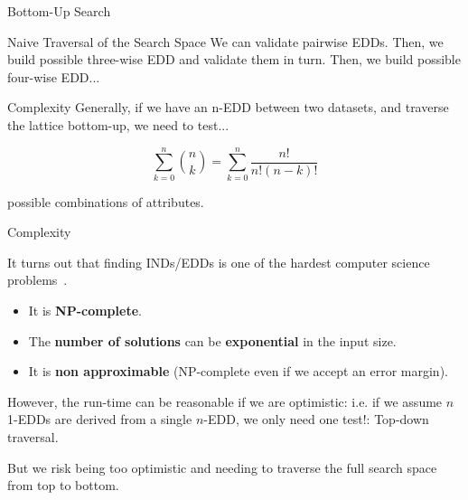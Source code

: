 \documentclass[10pt]{beamer}
\begin{document}
\begin{frame}{Bottom-Up Search}
    \begin{block}{Naive Traversal of the Search Space}
        \smallskip
        We can validate pairwise EDDs. Then, we build possible three-wise EDD and validate them in turn.
        Then, we build possible four-wise EDD...
    \end{block}
        
    \begin{alertblock}{Complexity}
    \smallskip
    Generally, if we have an n-EDD between two datasets, and traverse the lattice bottom-up, we need
    to test...
    
    \begin{equation*}
        \sum_{k=0}^{n}{\binom{n}{k}} = \sum_{k=0}^{n} \frac{n!}{n!(n - k)!}
    \end{equation*}
    
    possible combinations of attributes.
    \end{alertblock}
\end{frame}

\begin{frame}{Complexity}

    It turns out that finding INDs/EDDs is one of the hardest computer science
    problems~\cite{Blsius2017}.
    
    \begin{itemize}
        \item It is \textbf{NP-complete}.
        \item The \textbf{number of solutions} can be \textbf{exponential} in the input size.
        \item It is \textbf{non approximable} (NP-complete even if we accept an error margin).
    \end{itemize}
    
    \bigskip
    
    However, the run-time can be reasonable if we are optimistic: i.e. if we assume
    $n$ 1-EDDs are derived from a single $n$-EDD, we only need one test!: Top-down traversal.
    
    \bigskip
    
    But we risk being too optimistic and needing to traverse the full search space from top to bottom.
\end{frame}
\end{document}
